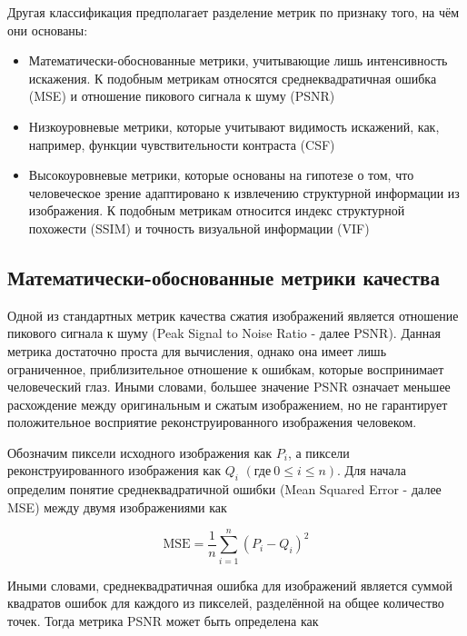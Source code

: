Другая классификация предполагает разделение метрик по признаку того, на чём они
основаны\cite[6]{FullReferenceIQMetrics}:

\begin{itemize}
    \item Математически-обоснованные метрики, учитывающие лишь интенсивность
    искажения. К подобным метрикам относятся среднеквадратичная ошибка (MSE) и
    отношение пикового сигнала к шуму (PSNR)
    \item Низкоуровневые метрики, которые учитывают видимость искажений, как,
    например, функции чувствительности контраста (CSF)
    \item Высокоуровневые метрики, которые основаны на гипотезе о том, что
    человеческое зрение адаптировано к извлечению структурной информации из
    изображения. К подобным метрикам относится индекс структурной похожести
    (SSIM) и точность визуальной информации (VIF)
\end{itemize}

\subsection{Математически-обоснованные метрики качества}

Одной из стандартных метрик качества сжатия изображений является отношение
пикового сигнала к шуму (Peak Signal to Noise Ratio - далее PSNR). Данная
метрика достаточно проста для вычисления, однако она имеет лишь ограниченное,
приблизительное отношение к ошибкам, которые воспринимает человеческий глаз.
Иными словами, большее значение PSNR означает меньшее расхождение между
оригинальным и сжатым изображением, но не гарантирует положительное восприятие
реконструированного изображения человеком\cite[279]{DataCompression}.

Обозначим пиксели исходного изображения как $P_{i}$, а пиксели
реконструированного изображения как $Q_{i}$ $\left(\text{где} \ 0 \le i \le
n\right)$. Для начала определим понятие среднеквадратичной ошибки (Mean Squared
Error - далее MSE) между двумя изображениями как

\begin{equation} \label{eq:img_mse}
    \text{MSE} = \frac{1}{n} \sum_{i=1}^{n}\left(P_{i} - Q_{i}\right)^2
\end{equation}

Иными словами, среднеквадратичная ошибка для изображений является суммой
квадратов ошибок для каждого из пикселей, разделённой на общее количество точек.
Тогда метрика PSNR может быть определена как

